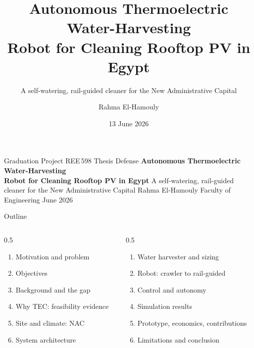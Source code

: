\documentclass[aspectratio=169,10pt]{beamer}
\title[Self-Watering PV-Cleaning Robot]{Autonomous Thermoelectric Water-Harvesting\\Robot for Cleaning Rooftop PV in Egypt}
\subtitle{A self-watering, rail-guided cleaner for the New Administrative Capital}
\author[R. El-Hamouly]{Rahma El-Hamouly}
\institute[REE598]{Graduation Project REE598 \\ Faculty of Engineering}
\date{13 June 2026}
\begin{document}
\nactitleframe
  {Graduation Project {\textbullet} REE\,598 {\textbullet} Thesis Defense}
  {\bfseries Autonomous Thermoelectric Water-Harvesting\\[0.15em]Robot for Cleaning Rooftop PV in Egypt}
  {A self-watering, rail-guided cleaner for the New Administrative Capital}
  {Rahma El-Hamouly}
  {Faculty of Engineering \quad{\textbullet} June 2026}

\begin{frame}{Outline}
  \begin{columns}[T]
    \begin{column}{0.5\textwidth}
      \begin{enumerate}\setlength\itemsep{0.35em}
        \item Motivation and problem
        \item Objectives
        \item Background and the gap
        \item Why TEC: feasibility evidence
        \item Site and climate: NAC
        \item System architecture
      \end{enumerate}
    \end{column}
    \begin{column}{0.5\textwidth}
      \begin{enumerate}\setlength\itemsep{0.35em}\setcounter{enumi}{6}
        \item Water harvester and sizing
        \item Robot: crawler to rail-guided
        \item Control and autonomy
        \item Simulation results
        \item Prototype, economics, contributions
        \item Limitations and conclusion
      \end{enumerate}
    \end{column}
  \end{columns}
\end{frame}
\end{document}
